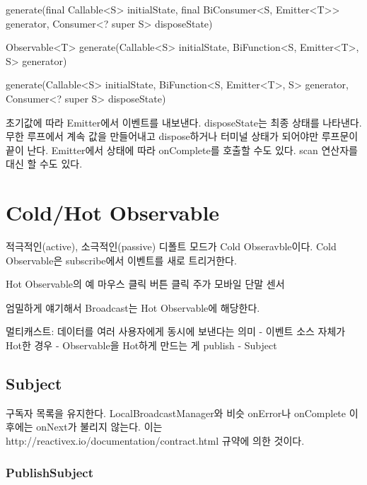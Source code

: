 \documentclass{book}
\begin{document}
generate(final Callable<S> initialState,
            final BiConsumer<S, Emitter<T>> generator,
            Consumer<? super S> disposeState)

Observable<T> generate(Callable<S> initialState, BiFunction<S, Emitter<T>, S> generator)

generate(Callable<S> initialState, BiFunction<S, Emitter<T>, S> generator,
            Consumer<? super S> disposeState) {

초기값에 따라 Emitter에서 이벤트를 내보낸다.            
disposeState는 최종 상태를 나타낸다.
무한 루프에서 계속 값을 만들어내고 dispose하거나 터미널 상태가 되어야만 루프문이 끝이 난다.
Emitter에서 상태에 따라 onComplete를 호출할 수도 있다.
scan 연산자를 대신 할 수도 있다.


\section{Cold/Hot Observable} 
적극적인(active), 소극적인(passive)
디폴트 모드가 Cold Obseravble이다.
Cold Observable은 subscribe에서 이벤트를 새로 트리거한다.

Hot Observable의 예
마우스 클릭
버튼 클릭
주가
모바일 단말 센서

엄밀하게 얘기해서 Broadcast는 Hot Observable에 해당한다. 

멀티캐스트: 데이터를 여러 사용자에게 동시에 보낸다는 의미
- 이벤트 소스 자체가 Hot한 경우
- Observable을 Hot하게 만드는 게 publish
- Subject


\subsection{Subject}
구독자 목록을 유지한다. LocalBroadcastManager와 비슷
onError나 onComplete 이후에는 onNext가 불리지 않는다.
이는 http://reactivex.io/documentation/contract.html 규약에 의한 것이다.

\subsubsection{PublishSubject}

}
\end{document}
